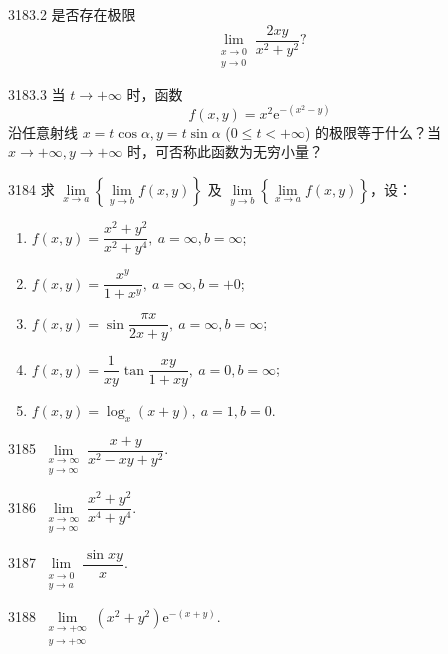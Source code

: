 \begin{prob}[S]{3183.2}
是否存在极限
\[
\lim_{\substack{x \to 0 \\ y \to 0}} \frac{2xy}{x^2 + y^2}?
\]
\end{prob}

\begin{prob}[M]{3183.3}
当 $t \to +\infty$ 时，函数
\[
f(x, y) = x^2 \mathrm{e}^{-(x^2 - y)}
\]
沿任意射线 $x = t\cos\alpha, y = t\sin\alpha$ ($0 \leqslant t < +\infty$) 的极限等于什么？当 $x \to +\infty, y \to +\infty$ 时，可否称此函数为无穷小量？
\end{prob}

\begin{prob}[L]{3184}
求 $\lim\limits_{x \to a} \left\{ \lim\limits_{y \to b} f(x, y) \right\}$ 及 $\lim\limits_{y \to b} \left\{ \lim\limits_{x \to a} f(x, y) \right\}$，设：
\begin{enumerate}[label=(\alph*), itemsep=2pt, topsep=3pt]
\item $f(x, y) = \dfrac{x^2 + y^2}{x^2 + y^4}, \ a = \infty, b = \infty$;
\item $f(x, y) = \dfrac{x^y}{1 + x^y}, \ a = \infty, b = +0$;
\item $f(x, y) = \sin\dfrac{\pi x}{2x + y}, \ a = \infty, b = \infty$;
\item $f(x, y) = \dfrac{1}{xy}\tan\dfrac{xy}{1 + xy}, \ a = 0, b = \infty$;
\item $f(x, y) = \log_x(x + y), \ a = 1, b = 0$.
\end{enumerate}
\end{prob}


\begin{prob}[S]{3185}
$\lim\limits_{\substack{x \to \infty \\ y \to \infty}} \dfrac{x + y}{x^2 - xy + y^2}$.
\end{prob}

\begin{prob}[S]{3186}
$\lim\limits_{\substack{x \to \infty \\ y \to \infty}} \dfrac{x^2 + y^2}{x^4 + y^4}$.
\end{prob}

\begin{prob}[S]{3187}
$\lim\limits_{\substack{x \to 0 \\ y \to a}} \dfrac{\sin xy}{x}$.
\end{prob}

\begin{prob}[S]{3188}
$\lim\limits_{\substack{x \to +\infty \\ y \to +\infty}} (x^2 + y^2)\mathrm{e}^{-(x + y)}$.
\end{prob}

